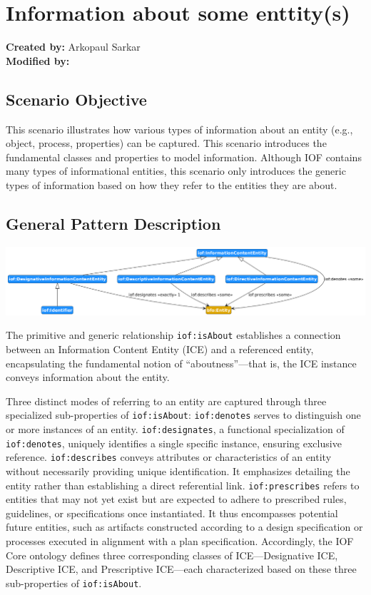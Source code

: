 \section{Information about some enttity(s)}
\label{sec-information-about}

\textbf{Created by:} Arkopaul Sarkar \\
\textbf{Modified by:}

\subsection*{Scenario Objective}
This scenario illustrates how various types of information about an entity (e.g., object, process, properties) can be captured. This scenario introduces the fundamental classes and properties to model information. Although IOF contains many types of informational entities, this scenario only introduces the generic types of information based on how they refer to the entities they are about.  

\subsection*{General Pattern Description}

\includegraphics[scale=0.4]{scenarios/information-and-aboutness/images/general-information-aboutness.png}

The primitive and generic relationship \texttt{iof:isAbout} establishes a connection between an Information Content Entity (ICE) and a referenced entity, encapsulating the fundamental notion of ``aboutness''—that is, the ICE instance conveys information about the entity.

Three distinct modes of referring to an entity are captured through three specialized sub-properties of \texttt{iof:isAbout}: \texttt{iof:denotes} serves to distinguish one or more instances of an entity.
\texttt{iof:designates}, a functional specialization of \texttt{iof:denotes}, uniquely identifies a single specific instance, ensuring exclusive reference.
\texttt{iof:describes} conveys attributes or characteristics of an entity without necessarily providing unique identification. It emphasizes detailing the entity rather than establishing a direct referential link.
\texttt{iof:prescribes} refers to entities that may not yet exist but are expected to adhere to prescribed rules, guidelines, or specifications once instantiated. It thus encompasses potential future entities, such as artifacts constructed according to a design specification or processes executed in alignment with a plan specification.
Accordingly, the IOF Core ontology defines three corresponding classes of ICE—Designative ICE, Descriptive ICE, and Prescriptive ICE—each characterized based on these three sub-properties of \texttt{iof:isAbout}. 

